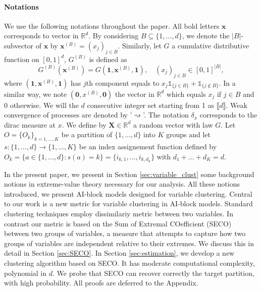 \documentclass[11pt]{article}
\begin{document}
	\paragraph{Notations} We use the following notations throughout the paper. All bold letters $\textbf{x}$ corresponds to vector in $\mathbb{R}^d$. By considering $B \subseteq \{1,\dots,d\}$, we denote the $|B|$-subvector of $\textbf{x}$ by $\textbf{x}^{(B)} = (x_j)_{j \in B}$. Similarly, let $G$ a cumulative distributive function on $[0,1]^d$, $G^{(B)}$ is defined as
	\begin{equation*}
		G^{(B)}(\textbf{x}^{(B)}) = G(\textbf{1},\textbf{x}^{(B)}, \textbf{1}), \quad (x_j)_{j \in B} \in [0,1]^{|B|},
	\end{equation*}
	where $(\textbf{1},\textbf{x}^{(B)}, \textbf{1})$ has $j$th component equals to $x_j \mathds{1}_{\{j \in B\}} + \mathds{1}_{\{ j \notin B\}}$. In a similar way, we note $(\textbf{0}, x^{(B)}, \textbf{0})$ the vector in $\mathbb{R}^d$ which equals $x_j$ if $j \in B$ and $ 0 $ otherwise. We will the $d$ consecutive integer set starting from 1 as $\llbracket d \rrbracket$. Weak convergence of processes are denoted by '$\rightsquigarrow$'. The notation $\delta_x$ corresponds to the dirac measure at $x$. We define by $\textbf{X} \in \mathbb{R}^d$ a random vector with law $G$. Let $O = \{O_k\}_{k= 1 ,\dots, K}$ be a partition of $\{1,\dots,d\}$ into $K$ groups and let $s : \{1,\dots,d\} \rightarrow \{1,\dots,K\}$ be an index assignement function defined by $O_k = \{a \in \{1,\dots,d\} : s(a) = k\} = \{i_{k,1}, \dots, i_{k,d_k}\}$ with $d_1+\dots+d_K = d$.
	
	In the present paper, we present in Section \ref{sec:variable_clust} some background notions in extreme-value theory necessary for our analysis. All these notions introduced, we present AI-block models designed for variable clustering. Central to our work is a new metric for variable clustering in AI-block models. Standard clustering techniques employ dissimilariy metric between two variables. In contrast our metric is based on the Sum of Extremal COefficient (SECO) between two groups of variables, a measure that attempts to capture how two groups of variables are independent relative to their extremes. We discuss this in detail in Section \ref{sec:SECO}. In Section \ref{sec:estimation}, we develop a new clustering algorithm based on SECO. It has moderate computational complexity, polynomial in $d$. We probe that SECO can recover correctly the target partition, with high probability. All proofs are deferred to the Appendix.
	
\end{document}
